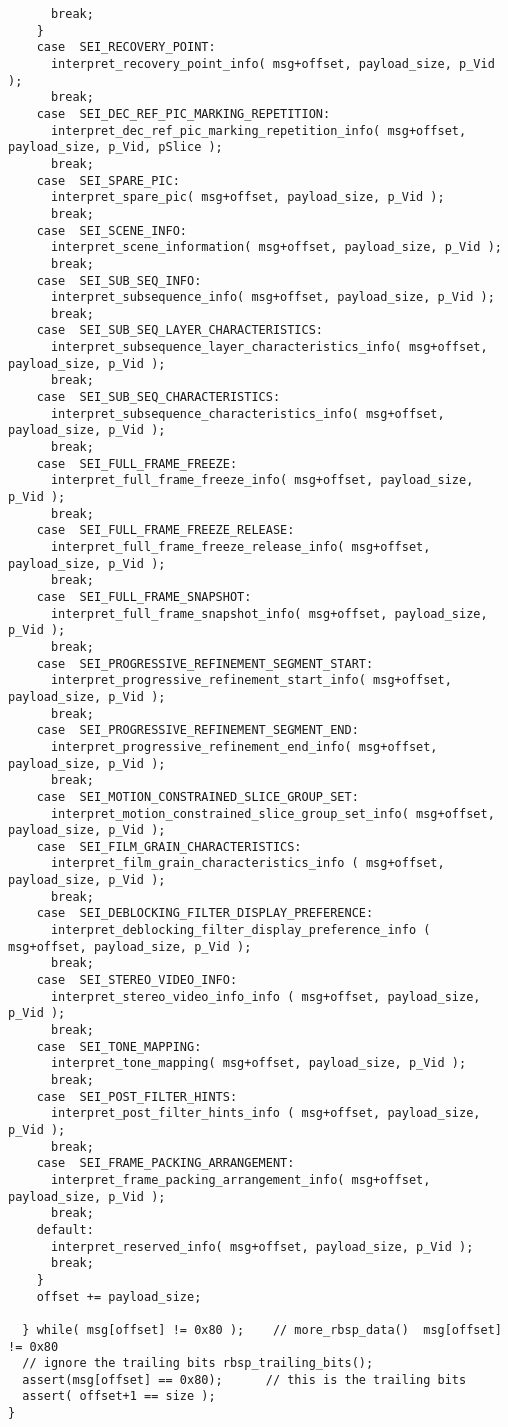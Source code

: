 \begin{lstlisting}
      break;
    }
    case  SEI_RECOVERY_POINT:
      interpret_recovery_point_info( msg+offset, payload_size, p_Vid );
      break;
    case  SEI_DEC_REF_PIC_MARKING_REPETITION:
      interpret_dec_ref_pic_marking_repetition_info( msg+offset, payload_size, p_Vid, pSlice );
      break;
    case  SEI_SPARE_PIC:
      interpret_spare_pic( msg+offset, payload_size, p_Vid );
      break;
    case  SEI_SCENE_INFO:
      interpret_scene_information( msg+offset, payload_size, p_Vid );
      break;
    case  SEI_SUB_SEQ_INFO:
      interpret_subsequence_info( msg+offset, payload_size, p_Vid );
      break;
    case  SEI_SUB_SEQ_LAYER_CHARACTERISTICS:
      interpret_subsequence_layer_characteristics_info( msg+offset, payload_size, p_Vid );
      break;
    case  SEI_SUB_SEQ_CHARACTERISTICS:
      interpret_subsequence_characteristics_info( msg+offset, payload_size, p_Vid );
      break;
    case  SEI_FULL_FRAME_FREEZE:
      interpret_full_frame_freeze_info( msg+offset, payload_size, p_Vid );
      break;
    case  SEI_FULL_FRAME_FREEZE_RELEASE:
      interpret_full_frame_freeze_release_info( msg+offset, payload_size, p_Vid );
      break;
    case  SEI_FULL_FRAME_SNAPSHOT:
      interpret_full_frame_snapshot_info( msg+offset, payload_size, p_Vid );
      break;
    case  SEI_PROGRESSIVE_REFINEMENT_SEGMENT_START:
      interpret_progressive_refinement_start_info( msg+offset, payload_size, p_Vid );
      break;
    case  SEI_PROGRESSIVE_REFINEMENT_SEGMENT_END:
      interpret_progressive_refinement_end_info( msg+offset, payload_size, p_Vid );
      break;
    case  SEI_MOTION_CONSTRAINED_SLICE_GROUP_SET:
      interpret_motion_constrained_slice_group_set_info( msg+offset, payload_size, p_Vid );
    case  SEI_FILM_GRAIN_CHARACTERISTICS:
      interpret_film_grain_characteristics_info ( msg+offset, payload_size, p_Vid );
      break;
    case  SEI_DEBLOCKING_FILTER_DISPLAY_PREFERENCE:
      interpret_deblocking_filter_display_preference_info ( msg+offset, payload_size, p_Vid );
      break;
    case  SEI_STEREO_VIDEO_INFO:
      interpret_stereo_video_info_info ( msg+offset, payload_size, p_Vid );
      break;
    case  SEI_TONE_MAPPING:
      interpret_tone_mapping( msg+offset, payload_size, p_Vid );
      break;
    case  SEI_POST_FILTER_HINTS:
      interpret_post_filter_hints_info ( msg+offset, payload_size, p_Vid );
      break;
    case  SEI_FRAME_PACKING_ARRANGEMENT:
      interpret_frame_packing_arrangement_info( msg+offset, payload_size, p_Vid );
      break;
    default:
      interpret_reserved_info( msg+offset, payload_size, p_Vid );
      break;    
    }
    offset += payload_size;

  } while( msg[offset] != 0x80 );    // more_rbsp_data()  msg[offset] != 0x80
  // ignore the trailing bits rbsp_trailing_bits();
  assert(msg[offset] == 0x80);      // this is the trailing bits
  assert( offset+1 == size );
}

\end{lstlisting}
